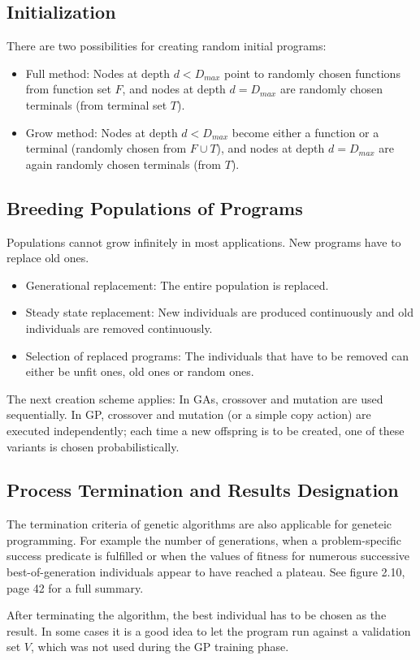 \documentclass[12pt]{book}
\begin{document}
\subsection{Initialization}
There are two possibilities for creating random initial programs:
\begin{itemize}
\item Full method: Nodes at depth $d < D_{max}$ point to randomly chosen functions from function set $F$, and nodes at depth $d = D_{max}$ are randomly chosen terminals (from terminal set $T$).
\item Grow method: Nodes at depth $d < D_{max}$ become either a function or a terminal (randomly chosen from $F \cup T$), and nodes at depth $d = D_{max}$ are again randomly chosen terminals (from $T$).
\end{itemize}
\subsection{Breeding Populations of Programs}
Populations cannot grow infinitely in most applications. New programs have to replace old ones.
\begin{itemize}
\item Generational replacement: The entire population is replaced.
\item Steady state replacement: New individuals are produced continuously and old individuals are removed continuously.
\item Selection of replaced programs: The individuals that have to be removed can either be unfit ones, old ones or random ones.
\end{itemize}
The next creation scheme applies: In GAs, crossover and mutation are used sequentially. In GP, crossover and mutation (or a simple copy action) are executed independently; each time a new offspring is to be created, one of these variants is chosen probabilistically.
\subsection{Process Termination and Results Designation}
\label{sec:2.3.4}
The termination criteria of genetic algorithms are also applicable for geneteic programming. For example the number of generations, when a problem-specific success predicate is fulfilled or when the values of fitness for numerous successive best-of-generation individuals appear to have reached a plateau. See figure 2.10, page 42 for a full summary.

After terminating the algorithm, the best individual has to be chosen as the result. In some cases it is a good idea to let the program run against a validation set $V$, which was not used during the GP training phase.
\end{document}
